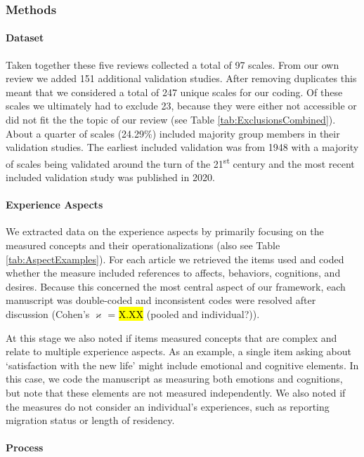 \subsubsection{Methods}  
\paragraph{Dataset}

Taken together these five reviews collected a total of 97 scales. From
our own review we added 151 additional validation studies. After
removing duplicates this meant that we considered a total of 247 unique
scales for our coding. Of these scales we ultimately had to exclude 23,
because they were either not accessible or did not fit the the topic of
our review (see Table \ref{tab:ExclusionsCombined}). About a quarter of
scales (24.29\%) included majority group members in their validation
studies. The earliest included validation was from 1948 with a majority
of scales being validated around the turn of the 21\textsuperscript{st}
century and the most recent included validation study was published in
2020.

\paragraph{Experience Aspects}

We extracted data on the experience aspects by primarily focusing on the
measured concepts and their operationalizations (also see Table
\ref{tab:AspectExamples}). For each article we retrieved the items used
and coded whether the measure included references to affects, behaviors,
cognitions, and desires. Because this concerned the most central aspect
of our framework, each manuscript was double-coded and inconsistent
codes were resolved after discussion (Cohen's \(\varkappa\) = \hl{X.XX}
(pooled and individual?)).

At this stage we also noted if items measured concepts that are complex
and relate to multiple experience aspects. As an example, a single item
asking about `satisfaction with the new life' might include emotional
and cognitive elements. In this case, we code the manuscript as
measuring both emotions and cognitions, but note that these elements are
not measured independently. We also noted if the measures do not
consider an individual's experiences, such as reporting migration status
or length of residency.

\paragraph{Process}

